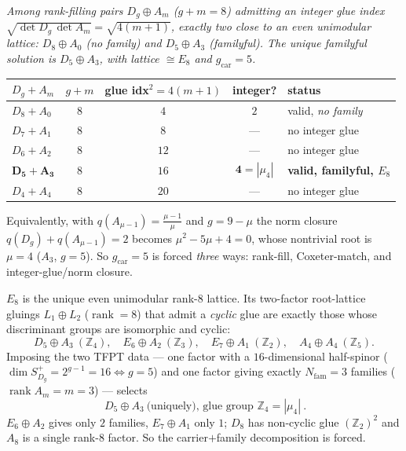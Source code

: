 \documentclass[11pt,a4paper]{article}
\newcommand{\gcar}{g_{\mathrm{car}}}
\newcommand{\Nfam}{N_{\mathrm{fam}}}
\newcommand{\Z}{\mathbb{Z}}
\theoremstyle{definition}
\renewcommand{\arraystretch}{1.15}
\begin{document}
\begin{keybox}
\emph{Among rank-filling pairs $D_g\oplus A_m$ ($g+m=8$) admitting an integer glue index
$\sqrt{\det D_g\,\det A_m}=\sqrt{4(m+1)}$, exactly two close to an even unimodular lattice: $D_8\oplus A_0$
(no family) and $D_5\oplus A_3$ (familyful). The unique familyful solution is $D_5\oplus A_3$, with
lattice $\cong E_8$ and $\gcar=5$.}
\begin{center}\scriptsize\renewcommand{\arraystretch}{1.05}
\begin{tabular}{@{}lcccl@{}}
\toprule
$D_g{+}A_m$ & $g{+}m$ & glue idx$^2{=}4(m{+}1)$ & integer? & status \\
\midrule
$D_8{+}A_0$ & $8$ & $4$ & $2$ & valid, \emph{no family} \\
$D_7{+}A_1$ & $8$ & $8$ & --- & no integer glue \\
$D_6{+}A_2$ & $8$ & $12$ & --- & no integer glue \\
$\mathbf{D_5{+}A_3}$ & $8$ & $16$ & $\mathbf 4{=}|\mu_4|$ & \textbf{valid, familyful, $E_8$} \\
$D_4{+}A_4$ & $8$ & $20$ & --- & no integer glue \\
\bottomrule
\end{tabular}
\end{center}
Equivalently, with $q(A_{\mu-1})=\tfrac{\mu-1}{\mu}$ and $g=9-\mu$ the norm closure
$q(D_g)+q(A_{\mu-1})=2$ becomes $\mu^2-5\mu+4=0$, whose nontrivial root is $\mu=4$ ($A_3$, $g=5$). So
$\gcar=5$ is forced \emph{three} ways: rank-fill, Coxeter-match, and integer-glue/norm closure. \mE\ 
\end{keybox}

\begin{keybox}
$E_8$ is the unique even unimodular rank-$8$ lattice. Its two-factor root-lattice gluings $L_1\oplus L_2$
($\operatorname{rank}=8$) that admit a \emph{cyclic} glue are exactly those whose discriminant groups are
isomorphic and cyclic:
\[
  D_5\oplus A_3\ (\Z_4),\quad E_6\oplus A_2\ (\Z_3),\quad E_7\oplus A_1\ (\Z_2),\quad A_4\oplus A_4\ (\Z_5).
\]
Imposing the two TFPT data --- one factor with a $16$-dimensional half-spinor ($\dim S^+_{D_g}=2^{g-1}=16\Leftrightarrow g=5$)
and one factor giving exactly $\Nfam=3$ families ($\operatorname{rank}A_m=m=3$) --- selects
\[
  \boxed{\ D_5\oplus A_3\ \text{(uniquely), glue group }\Z_4=|\mu_4|\ } .
\]
$E_6{\oplus}A_2$ gives only $2$ families, $E_7{\oplus}A_1$ only $1$; $D_8$ has non-cyclic glue
$(\Z_2)^2$ and $A_8$ is a single rank-$8$ factor. So the carrier$+$family decomposition is forced.
\end{keybox}
\end{document}
